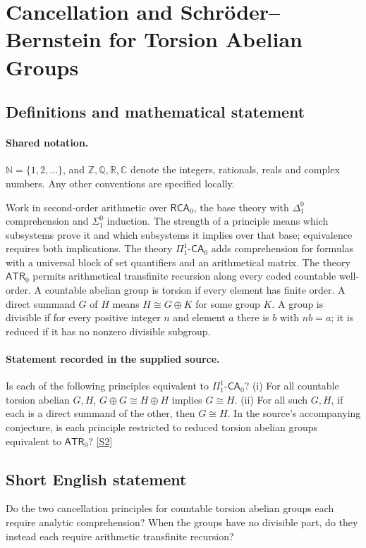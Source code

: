 \documentclass[11pt]{article}
\newcommand{\sref}[2]{\hyperlink{source:#1:#2}{[S#2]}}
\begin{document}
\section{Cancellation and Schröder–Bernstein for Torsion Abelian Groups}\label{statement}

\subsection{Definitions and mathematical statement}

\paragraph{Shared notation.}$\mathbb N=\{1,2,\ldots\}$, and $\mathbb Z,\mathbb Q,\mathbb R,\mathbb C$ denote the integers, rationals, reals and complex numbers. Any other conventions are specified locally.


Work in second-order arithmetic over $\mathsf{RCA}_0$, the base theory with $\Delta^0_1$ comprehension and $\Sigma^0_1$ induction. The strength of a principle means which subsystems prove it and which subsystems it implies over that base; equivalence requires both implications.  The theory $\Pi^1_1\text{-}\mathsf{CA}_0$ adds comprehension for formulas with a universal block of set quantifiers and an arithmetical matrix. The theory $\mathsf{ATR}_0$ permits arithmetical transfinite recursion along every coded countable well-order. A countable abelian group is torsion if every element has finite order. A direct summand $G$ of $H$ means $H\cong G\oplus K$ for some group $K$. A group is divisible if for every positive integer $n$ and element $a$ there is $b$ with $nb=a$; it is reduced if it has no nonzero divisible subgroup.
\paragraph{Statement recorded in the supplied source.}
Is each of the following principles equivalent to $\Pi^1_1\text{-}\mathsf{CA}_0$? (i) For all countable torsion abelian $G,H$, $G\oplus G\cong H\oplus H$ implies $G\cong H$. (ii) For all such $G,H$, if each is a direct summand of the other, then $G\cong H$. In the source’s accompanying conjecture, is each principle restricted to reduced torsion abelian groups equivalent to $\mathsf{ATR}_0$? \sref{statement}{2}
\subsection{Short English statement}
Do the two cancellation principles for countable torsion abelian groups each require analytic comprehension? When the groups have no divisible part, do they instead each require arithmetic transfinite recursion?
\end{document}
